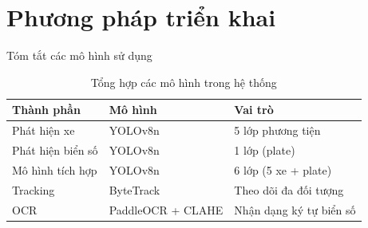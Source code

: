 \section{Phương pháp triển khai}

\begin{frame}{Tóm tắt các mô hình sử dụng}
    \begin{table}
        \centering
        \small
        \begin{tabular}{|l|l|l|}
            \hline
            \textbf{Thành phần} & \textbf{Mô hình} & \textbf{Vai trò} \\
            \hline
            Phát hiện xe & YOLOv8n & 5 lớp phương tiện \\
            \hline
            Phát hiện biển số & YOLOv8n & 1 lớp (plate) \\
            \hline
            Mô hình tích hợp & YOLOv8n & 6 lớp (5 xe + plate) \\
            \hline
            Tracking & ByteTrack & Theo dõi đa đối tượng \\
            \hline
            OCR & PaddleOCR + CLAHE & Nhận dạng ký tự biển số \\
            \hline
        \end{tabular}
        \caption{Tổng hợp các mô hình trong hệ thống}
    \end{table}


\end{frame}

